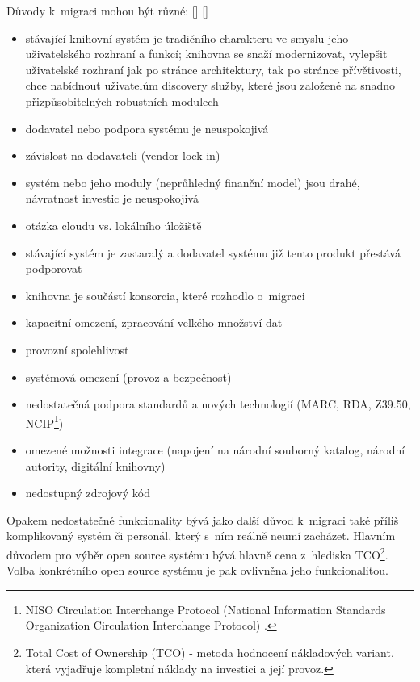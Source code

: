 \documentclass[
	11pt, oneside, printed, final, palatino, monochrome
	microtype,
	table,   %
	lof,     %
	lot     %
]{fithesis3}
\newcommand{\citepages}[2]{[\cite[#1]{#2}]}
\newcommand{\mezera}{\bigskip}
\begin{document}
{Důvody k~migraci mohou být různé: \citepages{152}{bilal_2014} \citepages{6-10}{bartosek_2002}
\mezera
\begin{itemize}
\item stávající knihovní systém je tradičního charakteru ve smyslu jeho uživatelského rozhraní a funkcí; knihovna se snaží modernizovat, vylepšit uživatelské rozhraní jak po stránce architektury, tak po stránce přívětivosti, chce nabídnout uživatelům discovery služby, které jsou založené na snadno přizpůsobitelných robustních modulech
\item dodavatel nebo podpora systému je neuspokojivá
\item závislost na dodavateli (vendor lock-in)
\item systém nebo jeho moduly (neprůhledný finanční model) jsou drahé, návratnost investic je neuspokojivá
\item otázka cloudu vs. lokálního úložiště
\item stávající systém je zastaralý a dodavatel systému již tento produkt přestává podporovat
\item knihovna je součástí konsorcia, které rozhodlo o~migraci
\item kapacitní omezení, zpracování velkého množství dat
\item provozní spolehlivost
\item systémová omezení (provoz a bezpečnost)
\item nedostatečná podpora standardů a nových technologií (MARC, RDA, Z39.50, NCIP\footnote{NISO Circulation Interchange Protocol (National Information Standards Organization Circulation Interchange Protocol)
.})
\item omezené možnosti integrace (napojení na národní souborný katalog, národní autority, digitální knihovny)
\item nedostupný zdrojový kód
\end{itemize}

Opakem nedostatečné funkcionality bývá jako další důvod k~migraci také příliš komplikovaný systém či personál, který s~ním reálně neumí zacházet. Hlavním důvodem pro výběr open source systému bývá hlavně cena z~hlediska TCO\footnote{Total Cost of Ownership (TCO) - metoda hodnocení nákladových variant, která vyjadřuje kompletní náklady na investici a její provoz.}. Volba konkrétního open source systému je pak ovlivněna jeho funkcionalitou.

}
\end{document}
